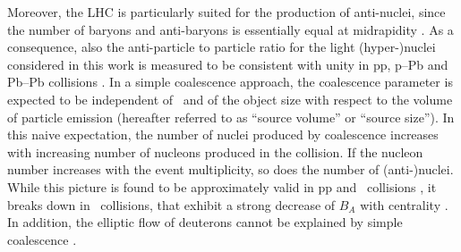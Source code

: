 Moreover, the LHC is particularly suited for the production of anti-nuclei, since the number of baryons and anti-baryons is essentially equal at midrapidity \cite{Abbas:2013rua}. As a consequence, also the anti-particle to particle ratio for the light (hyper-)nuclei considered in this work is measured to be consistent with unity in pp, p--Pb and Pb--Pb collisions \cite{ALICE:nucleipp2017, anielski-HQ14, Acharya:2017dmc, Adam:2015yta}.
In a simple coalescence approach, the coalescence parameter is expected to be independent of \pt~and of the object size with respect to the volume of particle emission (hereafter referred to as ``source volume'' or ``source size'').
In this naive expectation, the number of nuclei produced by coalescence increases with increasing number of nucleons produced in the collision. If the nucleon number increases with the event multiplicity, so does the number of (anti-)nuclei. 
While this picture is found to be approximately valid in pp and \pPb~collisions \cite{ALICE:nucleipp2017, anielski-HQ14}, it breaks down in \PbPb~collisions, that exhibit a strong decrease of $B_{A}$ with centrality \cite{ALICE:deuteronppPbPb2015}. 
In addition, the elliptic flow of deuterons cannot be explained by simple coalescence \cite{Acharya:2017dmc}. 

